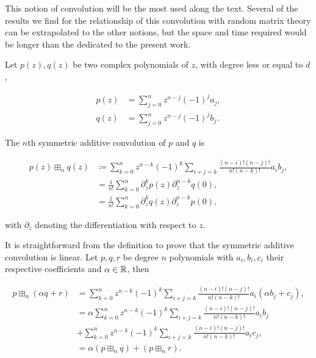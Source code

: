 This notion of convolution will be the most used along the text. Several of the results we find for the relationship of this convolution with random matrix theory can be extrapolated to the other notions, but the space and time required would be longer than the dedicated to the present work.

\begin{definition}\label{def:symadconv}
    Let $p(z), q(z)$ be two complex polynomials of $z$, with degree less or equal to $d$,

    \begin{align*}
        p(z) &= \sum_{j=0}^n z^{n-j}(-1)^{j}a_j,\\
        q(z) &= \sum_{j=0}^n z^{n-j}(-1)^{j}b_j.
    \end{align*}

    The $n$th symmetric additive convolution of $p$ and $q$ is

    \begin{align*}
        p(z) \boxplus_n q(z) &\coloneqq \sum_{k=0}^n z^{n-k}(-1)^k \sum_{i+j = k} \frac{(n-i)!(n-j)!}{n!(n-k)!}a_i b_j, \\
        &= \frac{1}{n!}\sum_{k=0}^n \partial_z^k p(z)\partial_z^{n-k}q(0),\\
        &= \frac{1}{n!}\sum_{k=0}^n \partial_z^k q(z)\partial_z^{n-k}p(0),
    \end{align*}

    \noindent with $\partial_z$ denoting the differentiation with respect to $z$.
\end{definition}

It is straightforward from the definition to prove that the symmetric additive convolution is linear. Let $p,q,r$ be degree $n$ polynomials with $a_i, b_i, c_i$ their respective coefficients and $\alpha \in \mathbb R$, then

\begin{align*}
    p \boxplus_n (\alpha q + r) &= \sum_{k=0}^n z^{n-k}(-1)^k \sum_{i+j = k} \frac{(n-i)!(n-j)!}{n!(n-k)!}a_i (\alpha b_j + c_j), \\ 
    &= \alpha \sum_{k=0}^n z^{n-k}(-1)^k \sum_{i+j = k} \frac{(n-i)!(n-j)!}{n!(n-k)!}a_i b_j\\ 
    &+ \sum_{k=0}^n z^{n-k}(-1)^k \sum_{i+j = k} \frac{(n-i)!(n-j)!}{n!(n-k)!}a_i c_j,\\
    &= \alpha(p \boxplus_n q) + (p \boxplus_n r).
\end{align*}



